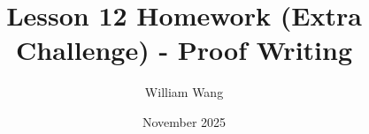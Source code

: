 \documentclass{article}
\title{Lesson 12 Homework (Extra Challenge) - Proof Writing}
\author{William Wang}
\date{November 2025}
\begin{document}
\maketitle

\section{}
\end{document}
